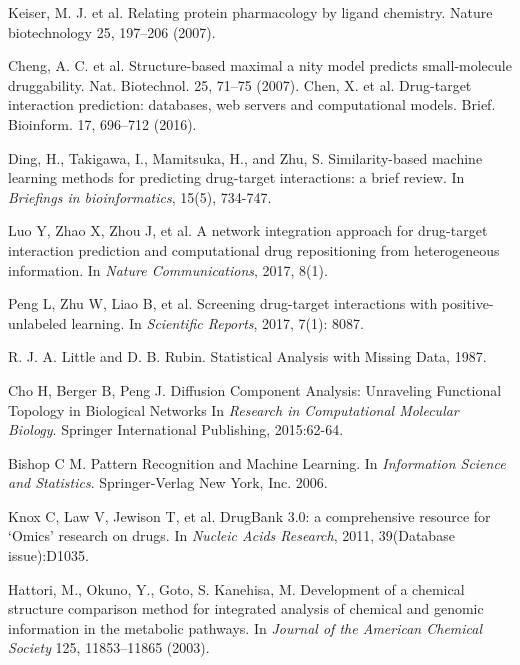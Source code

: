 \documentclass[conference]{IEEEtran}
\begin{document}
\begin{thebibliography}{10}

Keiser, M. J. et al. Relating protein pharmacology by ligand chemistry. Nature biotechnology 25, 197–206 (2007).

Cheng, A. C. et al. Structure-based maximal a nity model predicts small-molecule druggability. Nat. Biotechnol. 25, 71–75 (2007).
Chen, X. et al. Drug-target interaction prediction: databases, web servers and computational models. Brief. Bioinform. 17, 696–712 (2016).

Ding, H., Takigawa, I., Mamitsuka, H., and Zhu, S.
\newblock Similarity-based machine learning methods for predicting drug-target interactions: a brief review. \newblock In {\em Briefings in bioinformatics}, 15(5), 734-747.


Luo Y, Zhao X, Zhou J, et al.
\newblock A network integration approach for drug-target interaction prediction and computational drug repositioning from heterogeneous information.
\newblock In {\em Nature Communications}, 2017, 8(1).


Peng L, Zhu W, Liao B, et al.
\newblock Screening drug-target interactions with positive-unlabeled learning.
\newblock In {\em Scientific Reports}, 2017, 7(1): 8087.


R. J. A. Little and D. B. Rubin.
\newblock Statistical Analysis with Missing Data, 1987.

Cho H, Berger B, Peng J. 
\newblock Diffusion Component Analysis: Unraveling Functional Topology in Biological Networks
\newblock In {\em Research in Computational Molecular Biology}. Springer International Publishing, 2015:62-64.


Bishop C M. 
\newblock Pattern Recognition and Machine Learning. 
\newblock In {\em Information Science and Statistics}. Springer-Verlag New York, Inc. 2006.


Knox C, Law V, Jewison T, et al. 
\newblock DrugBank 3.0: a comprehensive resource for ‘Omics’ research on drugs. 
\newblock In {\em Nucleic Acids Research}, 2011, 39(Database issue):D1035.

Hattori, M., Okuno, Y., Goto, S.  Kanehisa, M.
\newblock Development of a chemical structure comparison method for integrated analysis of chemical and genomic information in the metabolic pathways. 
\newblock In {\em Journal of the American Chemical Society} 125, 11853–11865 (2003).



\end{thebibliography}
\end{document}
